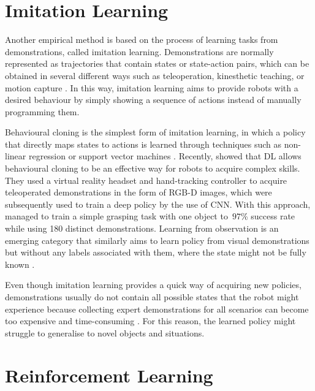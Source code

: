 \section{Imitation Learning}

Another empirical method is based on the process of learning tasks from demonstrations, called imitation learning. Demonstrations are normally represented as trajectories that contain states or state-action pairs, which can be obtained in several different ways such as teleoperation, kinesthetic teaching, or motion capture \cite{osa_algorithmic_2018}. In this way, imitation learning aims to provide robots with a desired behaviour by simply showing a sequence of actions instead of manually programming them.

Behavioural cloning is the simplest form of imitation learning, in which a policy that directly maps states to actions is learned through techniques such as non-linear regression or support vector machines \cite{osa_algorithmic_2018}. Recently, \citet{zhang_deep_2018} showed that DL allows behavioural cloning to be an effective way for robots to acquire complex skills. They used a virtual reality headset and hand-tracking controller to acquire teleoperated demonstrations in the form of RGB-D images, which were subsequently used to train a deep policy by the use of CNN. With this approach, \citeauthor{zhang_deep_2018} managed to train a simple grasping task with one object to~\(97\)\% success rate while using 180 distinct demonstrations. Learning from observation is an emerging category that similarly aims to learn policy from visual demonstrations but without any labels associated with them, where the state might not be fully known \cite{kroemer_review_2021}.

Even though imitation learning provides a quick way of acquiring new policies, demonstrations usually do not contain all possible states that the robot might experience because collecting expert demonstrations for all scenarios can become too expensive and time-consuming \cite{osa_algorithmic_2018}. For this reason, the learned policy might struggle to generalise to novel objects and situations.


\section{Reinforcement Learning}\label{sec:rw_reinforcement_learning}

